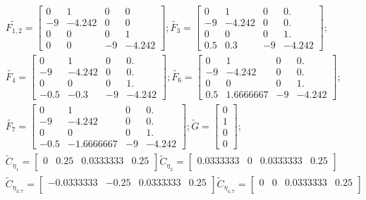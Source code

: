 \begin{align*}
	&\tilde{{F_{1,2}}} =
	\begin{bmatrix}
		  0   & 1     &  0  &  0\\     
		- 9 & - 4.242 &   0 &   0 \\    
		0   & 0  &     0  &  1     \\
		0   & 0 &    - 9 & - 4.242  	
	\end{bmatrix};
	\tilde{{F_3}} =
	\begin{bmatrix}
    0&     1&       0&    0.     \\
	- 9&   - 4.242 &  0&    0.    \\ 
	0&     0&       0&    1.    \\ 
	0.5 &  0.3 &  - 9&  - 4.242  
	\end{bmatrix};\\
	&\tilde{{F_4}} =
	\begin{bmatrix}
	    0&     1&       0&    0.     \\
		- 9&   - 4.242 &  0&    0.    \\ 
		0&     0&       0&    1.    \\ 
		-0.5 &  -0.3 &  - 9&  - 4.242  
	\end{bmatrix};
	\tilde{{F_6}} =
	\begin{bmatrix}
		0&     1&       0&    0.     \\
		- 9&   - 4.242 &  0&    0.    \\ 
		0&     0&       0&    1.    \\ 
		0.5  &  1.6666667 &  - 9&  - 4.242  
	\end{bmatrix};\\
	&\tilde{{F_7}} =
	\begin{bmatrix}
		0&     1&       0&    0.     \\
		- 9&   - 4.242 &  0&    0.    \\ 
		0&     0&       0&    1.    \\ 
		-0.5  &  -1.6666667 &  - 9&  - 4.242  
	\end{bmatrix};
	\tilde{{G}} =
	\begin{bmatrix}
		0\\1\\0\\0
	\end{bmatrix};\\
	&\tilde{{C}}_{\eta_1} =
	\begin{bmatrix}
		0&0.25&0.0333333 &   0.25\\
	\end{bmatrix}
	\tilde{{C}}_{\eta_2} =
	\begin{bmatrix}
		0.0333333&0&0.0333333 &   0.25\\
	\end{bmatrix}\\
	&\tilde{{C}}_{\eta_{3,7}} =
	\begin{bmatrix}
		-0.0333333&-0.25&0.0333333 &   0.25\\
	\end{bmatrix}
	\tilde{{C}}_{\eta_{4,7}} =
	\begin{bmatrix}
	0&0&0.0333333 &   0.25\\
	\end{bmatrix}
\end{align*}



